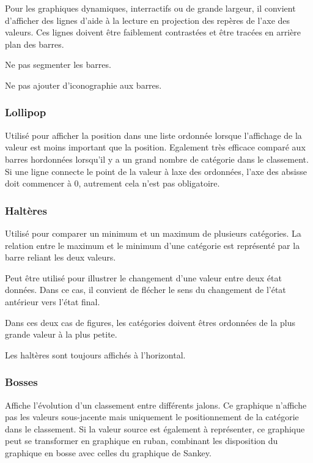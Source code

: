 \documentclass[a4paper,12pt]{article}
\begin{document}
\begin{multicols}{2}
Pour les graphiques dynamiques, interractifs ou de grande largeur, il convient d'afficher des lignes d'aide à la lecture en projection des repères de l'axe des valeurs. Ces lignes doivent être faiblement contrastées et être tracées en arrière plan des barres. \autocite{jonathanschwabishComparingCategories2021}

Ne pas segmenter les barres. \autocite{jonathanschwabishComparingCategories2021}

Ne pas ajouter d'iconographie aux barres. \autocite{tranDiscoveringAccessibleData2024}
\subsubsection*{Lollipop}
\label{sec:org49fcc56}
Utilisé pour afficher la position dans une liste ordonnée lorsque l'affichage de la valeur est moins important que la position. \autocite{alansmithLexiqueVisuel} Egalement très efficace comparé aux barres hordonnées lorsqu'il y a un grand nombre de catégorie dans le classement. \autocite{mikeyiHowChooseRight2020}  Si une ligne connecte le point de la valeur à laxe des ordonnées, l'axe des absisse doit commencer à 0, autrement cela n'est pas obligatoire.
\subsubsection*{Haltères}
\label{sec:org0237b31}
Utilisé pour comparer un minimum et un maximum de plusieurs catégories. \autocite{alansmithLexiqueVisuel} La relation entre le maximum et le minimum d'une catégorie est représenté par la barre reliant les deux valeurs. \autocite{mikeyiHowChooseRight2020}

Peut être utilisé pour illustrer le changement d'une valeur entre deux état données. Dans ce cas, il convient de flécher le sens du changement de l'état antérieur vers l'état final.

Dans ces deux cas de figures, les catégories doivent êtres ordonnées de la plus grande valeur à la plus petite.

Les haltères sont toujours affichés à l'horizontal.
\subsubsection*{Bosses}
\label{sec:org0b5f654}
Affiche l'évolution d'un classement entre différents jalons. \autocite{mikeyiHowChooseRight2020,alansmithLexiqueVisuel}  Ce graphique n'affiche pas les valeurs sous-jacente mais uniquement le positionnement de la catégorie dans le classement. \autocite{jonathanschwabishTime2021} Si la valeur source est également à représenter, ce graphique peut se transformer en graphique en ruban, combinant les disposition du graphique en bosse avec celles du graphique de Sankey. \autocite{jonathanschwabishTime2021}

\end{multicols}
\end{document}
